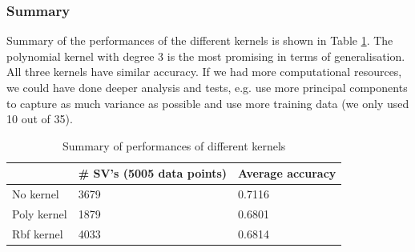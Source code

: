 \subsubsection{Summary}
Summary of the performances of the different kernels is shown in Table \ref{table:svmResults}. The polynomial kernel with degree 3 is the most promising in terms of generalisation. All three kernels have similar accuracy. If we had more computational resources, we could have done deeper analysis and tests, e.g. use more principal components to capture as much variance as possible and use more training data (we only used 10 out of 35).

\begin{table}[h]
	\centering
	\begin{tabular}{@{}lll@{}}
	\toprule
	            & \# SV's (5005 data points) & Average accuracy \\ \midrule
	No kernel   & 3679                       & 0.7116           \\
	Poly kernel & 1879                       & 0.6801           \\
	Rbf kernel  & 4033                       & 0.6814           \\ \bottomrule
	\end{tabular}
	\caption{Summary of performances of different kernels}
	\label{table:svmResults}
\end{table}